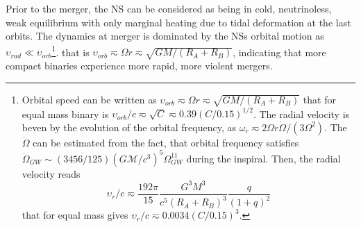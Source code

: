 Prior to the merger, the \ac{NS} can be considered as being in cold, neutrinoless, 
weak equilibrium with only marginal heating due to tidal deformation at the last orbits.
The dynamics at merger is dominated by the \acp{NS} orbital motion
as $\upsilon_{rad}\ll\upsilon_{orb}$\footnote{
    Orbital speed can be written as $\upsilon_{orb}\eqsim\Omega r\eqsim\sqrt{GM/(R_A + R_B)}$
    that for equal mass binary is $\upsilon_{orb}/c\eqsim\sqrt{C}\eqsim0.39(C/0.15)^{1/2}$.
    The radial velocity is beven by the evolution of the orbital frequency, as 
    $\omega_r \eqsim 2\Omega r \dot{\Omega}/(3\Omega^2)$. The $\dot{\Omega}$ can be 
    estimated from the fact, that orbital frequency satisfies 
    $\dot{\Omega}_{GW}\sim(3456/125)(G\mathcal{M}/c^3)^5\Omega_{GW}^{11}$ during the 
    inspiral. Then, the radial velocity reads 
    \begin{equation}
    \upsilon_r/c\eqsim\frac{192\pi}{15}\frac{G^3 M^3}{c^5(R_A + R_B)^3}\frac{q}{(1+q)^2}
    \end{equation}
    that for equal mass gives $\upsilon_r/c \eqsim 0.0034 (C/0.15)^3$.
}.
that is $\upsilon_{orb}\eqsim\Omega r\eqsim\sqrt{GM/(R_A + R_B)}$, indicating that 
more compact binaries experience more rapid, more violent mergers.

